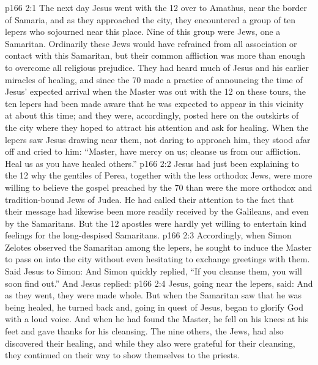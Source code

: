 \vs p166 2:1 The next day Jesus went with the 12 over to Amathus, near the border of Samaria, and as they approached the city, they encountered a group of ten lepers who sojourned near this place. Nine of this group were Jews, one a Samaritan. Ordinarily these Jews would have refrained from all association or contact with this Samaritan, but their common affliction was more than enough to overcome all religious prejudice. They had heard much of Jesus and his earlier miracles of healing, and since the 70 made a practice of announcing the time of Jesus’ expected arrival when the Master was out with the 12 on these tours, the ten lepers had been made aware that he was expected to appear in this vicinity at about this time; and they were, accordingly, posted here on the outskirts of the city where they hoped to attract his attention and ask for healing. When the lepers saw Jesus drawing near them, not daring to approach him, they stood afar off and cried to him: “Master, have mercy on us; cleanse us from our affliction. Heal us as you have healed others.”
\vs p166 2:2 Jesus had just been explaining to the 12 why the gentiles of Perea, together with the less orthodox Jews, were more willing to believe the gospel preached by the 70 than were the more orthodox and tradition\hyp{}bound Jews of Judea. He had called their attention to the fact that their message had likewise been more readily received by the Galileans, and even by the Samaritans. But the 12 apostles were hardly yet willing to entertain kind feelings for the long\hyp{}despised Samaritans.
\vs p166 2:3 Accordingly, when Simon Zelotes observed the Samaritan among the lepers, he sought to induce the Master to pass on into the city without even hesitating to exchange greetings with them. Said Jesus to Simon:  And Simon quickly replied, “If you cleanse them, you will soon find out.” And Jesus replied: 
\vs p166 2:4 Jesus, going near the lepers, said:  And as they went, they were made whole. But when the Samaritan saw that he was being healed, he turned back and, going in quest of Jesus, began to glorify God with a loud voice. And when he had found the Master, he fell on his knees at his feet and gave thanks for his cleansing. The nine others, the Jews, had also discovered their healing, and while they also were grateful for their cleansing, they continued on their way to show themselves to the priests.
